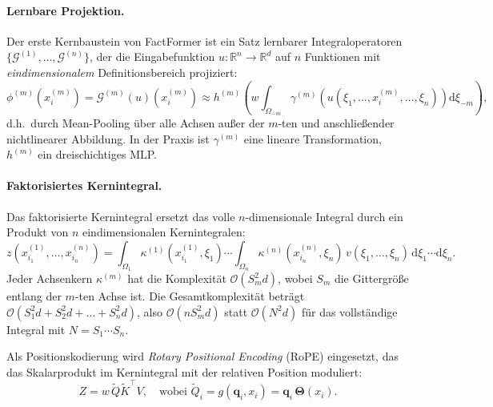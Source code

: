 \documentclass[a4paper,12pt]{article}
\begin{document}
\paragraph{Lernbare Projektion.}
Der erste Kernbaustein von FactFormer ist ein Satz lernbarer Integraloperatoren
$\{\mathcal{G}^{(1)}, \ldots, \mathcal{G}^{(n)}\}$, der die Eingabefunktion
$u : \mathbb{R}^n \to \mathbb{R}^d$ auf $n$ Funktionen mit
\emph{eindimensionalem} Definitionsbereich projiziert:
\begin{equation}
    \phi^{(m)}(x_i^{(m)}) = \mathcal{G}^{(m)}(u)(x_i^{(m)})
    \approx h^{(m)}\!\left(w \int_{\Omega_{-m}} \gamma^{(m)}\!\left(u(\xi_1, \ldots, x_i^{(m)}, \ldots, \xi_n)\right) \mathrm{d}\xi_{-m}\right),
\end{equation}
d.h.\ durch Mean-Pooling über alle Achsen außer der $m$-ten und anschließender nichtlinearer
Abbildung. In der Praxis ist $\gamma^{(m)}$ eine lineare Transformation, $h^{(m)}$ ein
dreischichtiges MLP.

\paragraph{Faktorisiertes Kernintegral.}
Das faktorisierte Kernintegral ersetzt das volle $n$-dimensionale Integral durch ein
Produkt von $n$ eindimensionalen Kernintegralen:
\begin{equation}
    z\!\left(x_{i_1}^{(1)}, \ldots, x_{i_n}^{(n)}\right)
    = \int_{\Omega_1} \kappa^{(1)}(x_{i_1}^{(1)}, \xi_1) \cdots
      \int_{\Omega_n} \kappa^{(n)}(x_{i_n}^{(n)}, \xi_n)\,
      v(\xi_1, \ldots, \xi_n)\,\mathrm{d}\xi_1 \cdots \mathrm{d}\xi_n.
\end{equation}
Jeder Achsenkern $\kappa^{(m)}$ hat die Komplexität $\mathcal{O}(S_m^2 d)$,
wobei $S_m$ die Gittergröße entlang der $m$-ten Achse ist. Die Gesamtkomplexität
beträgt $\mathcal{O}(S_1^2 d + S_2^2 d + \ldots + S_n^2 d)$, also
$\mathcal{O}(n S_m^2 d)$ statt $\mathcal{O}(N^2 d)$ für das vollständige Integral
mit $N = S_1 \cdots S_n$.

Als Positionskodierung wird \emph{Rotary Positional Encoding} (RoPE) eingesetzt,
das das Skalarprodukt im Kernintegral mit der relativen Position moduliert:
\begin{equation}
    Z = w\,\widetilde{Q}\widetilde{K}^\top V, \quad
    \text{wobei } \widetilde{Q}_i = g(\mathbf{q}_i, x_i) = \mathbf{q}_i\,\boldsymbol{\Theta}(x_i).
\end{equation}

\end{document}
